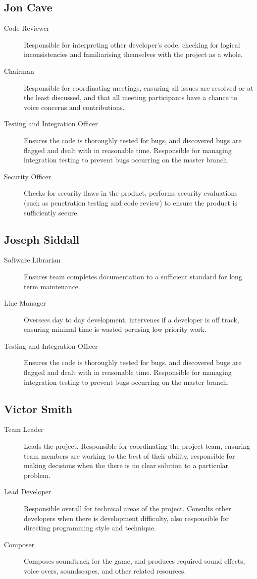 \subsection{Jon Cave}
\begin{description}
    \item[Code Reviewer] Responsible for interpreting other developer's code, checking for logical inconsistencies and familiarising themselves with the project as a whole.
    \item[Chairman] Responsible for coordinating meetings, ensuring all issues are resolved or at the least discussed, and that all meeting participants have a chance to voice concerns and contributions.
    \item[Testing and Integration Officer] Ensures the code is thoroughly tested for bugs, and discovered bugs are flagged and dealt with in reasonable time. Responsible for managing integration testing to prevent bugs occurring on the master branch.
    \item[Security Officer] Checks for security flaws in the product, performs security evaluations (such as penetration testing and code review) to ensure the product is sufficiently secure.
\end{description}

\subsection{Joseph Siddall}
\begin{description}
    \item[Software Librarian] Ensures team completes documentation to a sufficient standard for long term maintenance. 
    \item[Line Manager] Oversees day to day development, intervenes if a developer is off track, ensuring minimal time is wasted perusing low priority work.
    \item[Testing and Integration Officer] Ensures the code is thoroughly tested for bugs, and discovered bugs are flagged and dealt with in reasonable time. Responsible for managing integration testing to prevent bugs occurring on the master branch.
\end{description}

\subsection{Victor Smith}
\begin{description}
    \item[Team Leader] Leads the project. Responsible for coordinating the project team, ensuring team members are working to the best of their ability, responsible for making decisions when the there is no clear solution to a particular problem.
    \item[Lead Developer] Responsible overall for technical areas of the project. Consults other developers when there is development difficulty, also responsible for directing programming style and technique.
    \item[Composer] Composes soundtrack for the game, and produces required sound effects, voice overs, soundscapes, and other related resources.
\end{description}

